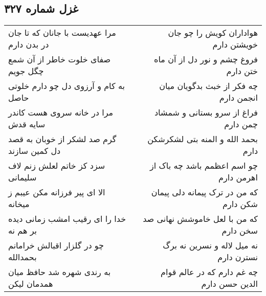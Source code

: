 \begin{center}
\section*{غزل شماره ۳۲۷}
\label{sec:sh327}
\begin{longtable}{l p{0.5cm} r}
مرا عهدیست با جانان که تا جان در بدن دارم
&&
هواداران کویش را چو جان خویشتن دارم
\\
صفای خلوت خاطر از آن شمع چگل جویم
&&
فروغ چشم و نور دل از آن ماه ختن دارم
\\
به کام و آرزوی دل چو دارم خلوتی حاصل
&&
چه فکر از خبث بدگویان میان انجمن دارم
\\
مرا در خانه سروی هست کاندر سایه قدش
&&
فراغ از سرو بستانی و شمشاد چمن دارم
\\
گرم صد لشکر از خوبان به قصد دل کمین سازند
&&
بحمد الله و المنه بتی لشکرشکن دارم
\\
سزد کز خاتم لعلش زنم لاف سلیمانی
&&
چو اسم اعظمم باشد چه باک از اهرمن دارم
\\
الا ای پیر فرزانه مکن عیبم ز میخانه
&&
که من در ترک پیمانه دلی پیمان شکن دارم
\\
خدا را ای رقیب امشب زمانی دیده بر هم نه
&&
که من با لعل خاموشش نهانی صد سخن دارم
\\
چو در گلزار اقبالش خرامانم بحمدالله
&&
نه میل لاله و نسرین نه برگ نسترن دارم
\\
به رندی شهره شد حافظ میان همدمان لیکن
&&
چه غم دارم که در عالم قوام الدین حسن دارم
\\
\end{longtable}
\end{center}
